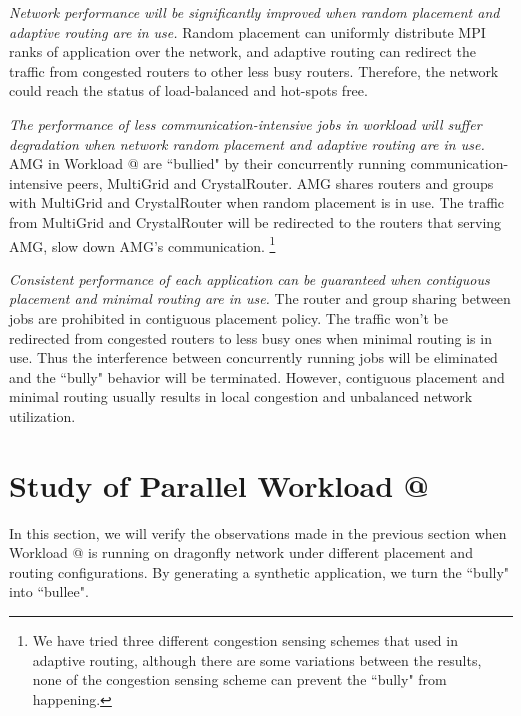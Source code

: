 \documentclass[conference,compsoc]{IEEEtran}
\makeatletter
\newcommand{\Rmnum}[1]{\expandafter\@slowromancap\romannumeral #1@}
\makeatother
\begin{document}
\emph{Network performance will be significantly improved when random placement and adaptive routing are in use.} Random placement can uniformly distribute MPI ranks of application over the network, and adaptive routing can redirect the traffic from congested routers to other less busy routers. Therefore, the network could reach the status of load-balanced and hot-spots free. 

\emph{The performance of less communication-intensive jobs in workload will suffer degradation when network random placement and adaptive routing are in use.} AMG in Workload \Rmnum{1} are ``bullied" by their concurrently running communication-intensive peers, MultiGrid and CrystalRouter. AMG shares routers and groups with MultiGrid and CrystalRouter when random placement is in use. The traffic from MultiGrid and CrystalRouter will be redirected to the routers that serving AMG, slow down AMG's communication. \footnote{We have tried three different congestion sensing schemes that used in adaptive routing\cite{won-prog-adaptive}, although there are some variations between the results, none of the congestion sensing scheme can prevent the ``bully" from happening.}

\emph{Consistent performance of each application can be guaranteed when contiguous placement and minimal routing are in use.} The router and group sharing between jobs are prohibited in contiguous placement policy. The traffic won't be redirected from congested routers to less busy ones when minimal routing is in use. Thus the interference between concurrently running jobs will be eliminated and the ``bully" behavior will be terminated. However, contiguous placement and minimal routing usually results in local congestion and unbalanced network utilization.


\section{Study of Parallel Workload \Rmnum{2 }}
\label{sec:workload-2}

In this section, we will verify the observations made in the previous section when Workload \Rmnum{1 } is running on dragonfly network under different placement and routing configurations. By generating a synthetic application, we turn the ``bully" into ``bullee". 
\end{document}
